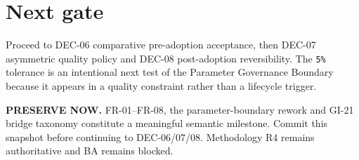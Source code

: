 \documentclass[11pt,a4paper]{article}
\begin{document}
\section{Next gate}
Proceed to DEC-06 comparative pre-adoption acceptance, then DEC-07 asymmetric quality policy and DEC-08 post-adoption reversibility. The \texttt{5\%} tolerance is an intentional next test of the Parameter Governance Boundary because it appears in a quality constraint rather than a lifecycle trigger.

\begin{ddtacore}[title={Checkpoint disposition}]
\textbf{PRESERVE NOW.} FR-01--FR-08, the parameter-boundary rework and GI-21 bridge taxonomy constitute a meaningful semantic milestone. Commit this snapshot before continuing to DEC-06/07/08. Methodology R4 remains authoritative and BA remains blocked.
\end{ddtacore}
\end{document}
